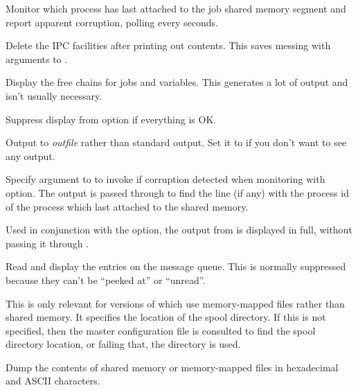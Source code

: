 
Monitor which process has last attached to the job shared memory segment and report apparent corruption, polling every  seconds.


Delete the IPC facilities after printing out contents. This saves messing with arguments to .


Display the free chains for jobs and variables. This generates a lot of output and isn't usually necessary.


Suppress display from  option if everything is OK.


Output to \textit{outfile} rather than standard output. Set it to  if you don't want to see any
output.


Specify argument to  to invoke if corruption detected when monitoring with 
option. The output is passed through  to find the line (if any) with the process id of the process which last
attached to the shared memory.


Used in conjunction with the  option, the output from  is displayed in
full, without passing it through .


Read and display the entries on the message queue. This is normally suppressed because they can't be
``peeked at'' or ``unread''.


This is only relevant for versions of \ProductName{} which use memory-mapped files rather
than shared memory. It specifies the location of the spool directory.
If this is not specified, then the master configuration file \linebreak[3]\masterconfig is consulted to find the spool
directory location, or failing that, the directory \spooldir{} is used.


Dump the contents of shared memory or memory-mapped files in hexadecimal and ASCII characters.

